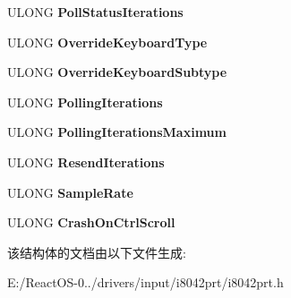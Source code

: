 \begin{DoxyCompactItemize}
\item 
\mbox{\label{struct___i8042___s_e_t_t_i_n_g_s_ac20775608ee7ec0d6677f9ccdd3221b6}} 
U\+L\+O\+NG {\bfseries Poll\+Status\+Iterations}
\item 
\mbox{\label{struct___i8042___s_e_t_t_i_n_g_s_a8c71ef826bc2936549af234589422e45}} 
U\+L\+O\+NG {\bfseries Override\+Keyboard\+Type}
\item 
\mbox{\label{struct___i8042___s_e_t_t_i_n_g_s_a40cfe6e007954f2a727f0939cca72356}} 
U\+L\+O\+NG {\bfseries Override\+Keyboard\+Subtype}
\item 
\mbox{\label{struct___i8042___s_e_t_t_i_n_g_s_a197069a9743704ed0693176564e8e896}} 
U\+L\+O\+NG {\bfseries Polling\+Iterations}
\item 
\mbox{\label{struct___i8042___s_e_t_t_i_n_g_s_ad6acf2c9df6f13ffb256c9eb6e4c5173}} 
U\+L\+O\+NG {\bfseries Polling\+Iterations\+Maximum}
\item 
\mbox{\label{struct___i8042___s_e_t_t_i_n_g_s_ac2dea89286ba037036a89d6401f8f3b8}} 
U\+L\+O\+NG {\bfseries Resend\+Iterations}
\item 
\mbox{\label{struct___i8042___s_e_t_t_i_n_g_s_acc8fcdc5f782aa8c0af17f81e07ccc23}} 
U\+L\+O\+NG {\bfseries Sample\+Rate}
\item 
\mbox{\label{struct___i8042___s_e_t_t_i_n_g_s_a353d3c558eaf28edca53011f15bbbbe1}} 
U\+L\+O\+NG {\bfseries Crash\+On\+Ctrl\+Scroll}
\end{DoxyCompactItemize}


该结构体的文档由以下文件生成\+:\begin{DoxyCompactItemize}
\item 
E\+:/\+React\+O\+S-\/0../drivers/input/i8042prt/i8042prt.\+h\end{DoxyCompactItemize}
